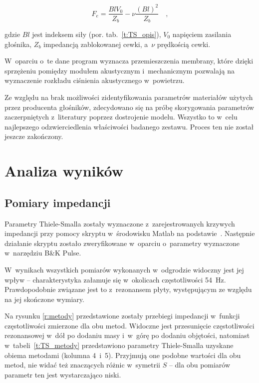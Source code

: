 \documentclass[12pt]{oska}
\begin{document}
		\begin{equation}
			F_e=\frac{BlV_0}{Z_b}-\nu\frac{(Bl)^2}{Z_b} \quad, \label{eq:sila}
		\end{equation}
		
		\noindent gdzie $Bl$ jest indeksem siły (por. tab.~\ref{t:TS_opis}), $V_0$ napięciem zasilania głośnika, $Z_b$ impedancją zablokowanej cewki, a~$\nu$ prędkością cewki. 
		
		W~oparciu o~te dane program wyznacza przemieszczenia membrany, które dzięki sprzężeniu pomiędzy modułem akustycznym i~mechanicznym pozwalają na wyznaczenie rozkładu ciśnienia akustycznego w~powietrzu.
		
		Ze względu na brak możliwości zidentyfikowania parametrów materiałów użytych przez producenta głośników, zdecydowano się na próbę skorygowania parametrów zaczerpniętych z~literatury \cite{modelowanie} poprzez dostrojenie modelu. Wszystko to w~celu najlepszego odzwierciedlenia właściwości badanego zestawu. Proces ten nie został jeszcze zakończony.
		

\section{Analiza wyników}

	\subsection{Pomiary impedancji}
		
		Parametry Thiele-Smalla zostały wyznaczone z~zarejestrowanych krzywych impedancji przy pomocy skryptu w~środowisku Matlab na podstawie~\cite{dobrucki}. Następnie działanie skryptu zostało zweryfikowane w~oparciu o~parametry wyznaczone w~narzędziu B\&K Pulse. 
		
		W~wynikach wszystkich pomiarów wykonanych w~odgrodzie widoczny jest jej wpływ -- charakterystyka załamuje się w~okolicach częstotliwości \SI{54}{\hertz}. Prawdopodobnie związane jest to z~rezonansem płyty, występującym ze względu na jej skończone wymiary.
		
		Na rysunku \ref{r:metody} przedstawione zostały przebiegi impedancji w~funkcji częstotliwości zmierzone dla obu metod. Widoczne jest przesunięcie częstotliwości rezonansowej w~dół po dodaniu masy i~w~górę po dodaniu objętości, natomiast w~tabeli~\ref{t:TS_metody} przedstawiono parametry Thiele-Smalla uzyskane obiema metodami (kolumna 4~i~5). Przyjmują one podobne wartości dla obu metod, nie widać też znaczących różnic w~symetrii $S$ -- dla obu pomiarów parametr ten jest wystarczająco niski.
		
\end{document}
